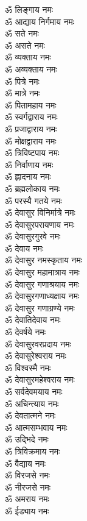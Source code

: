 \begin{multicols}{2}
\begin{flushleft}
ॐ लिङ्गाय नमः\\
ॐ आद्याय निर्गमाय नमः\\
ॐ सते नमः\hfill{}\\
ॐ असते नमः\\
ॐ व्यक्ताय नमः\\
ॐ अव्यक्ताय नमः\\
ॐ पित्रे नमः\\
ॐ मात्रे नमः\\
ॐ पितामहाय नमः\\
ॐ स्वर्गद्वाराय नमः\\
ॐ प्रजाद्वाराय नमः\\
ॐ मोक्षद्वाराय नमः\\
ॐ त्रिविष्टपाय नमः\hfill{}\\
ॐ निर्वाणाय नमः\\
ॐ ह्लादनाय नमः\\
ॐ ब्रह्मलोकाय नमः\\
ॐ परस्यै गतये नमः\\
ॐ देवासुर विनिर्मात्रे नमः\\
ॐ देवासुरपरायणाय नमः\\
ॐ देवासुरगुरवे नमः\\
ॐ देवाय नमः\\
ॐ देवासुर नमस्कृताय नमः\\
ॐ देवासुर महामात्राय नमः\hfill{}\\
ॐ देवासुर गणाश्रयाय नमः\\
ॐ देवासुरगणाध्यक्षाय नमः\\
ॐ देवासुर गणाग्रण्ये नमः\\
ॐ देवातिदेवाय नमः\\
ॐ देवर्षये नमः\\
ॐ देवासुरवरप्रदाय नमः\\
ॐ देवासुरेश्वराय नमः\\
ॐ विश्वस्मै नमः\\
ॐ देवासुरमहेश्वराय नमः\\
ॐ सर्वदेवमयाय नमः\hfill{}\\
ॐ अचिन्त्याय नमः\\
ॐ देवतात्मने नमः\\
ॐ आत्मसम्भवाय नमः\\
ॐ उद्भिदे नमः\\
ॐ त्रिविक्रमाय नमः\\
ॐ वैद्याय नमः\\
ॐ विरजसे नमः\\
ॐ नीरजसे नमः\\
ॐ अमराय नमः\\
ॐ ईड्याय नमः\hfill{}\\

\end{flushleft}
\end{multicols}
